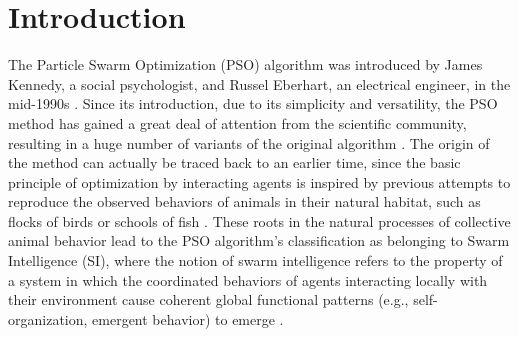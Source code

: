 \documentclass{ims9x6}
\begin{document}
\vspace*{12pt}

\chaptercontents  %

\section{Introduction}

The Particle Swarm Optimization (PSO) algorithm was introduced by James Kennedy, a social psychologist, and Russel Eberhart, an electrical engineer, in the mid-1990s \cite{kennedy1995particle,kennedy1997particle}. Since its introduction, due to its simplicity and versatility, the PSO method has gained a great deal of attention from the scientific community, resulting in a huge number of variants of the original algorithm \cite{kennedy2010particle,poli2007particle,shieber98,hassan04,wang2017particle}. The origin of the method can actually be traced back to an earlier time, since the basic principle of optimization by interacting agents is inspired by previous attempts to reproduce the observed behaviors of animals in their natural habitat, such as flocks of birds or schools of fish \cite{Aoki,Okubo,Vicseck,Giardina2008collective,boids1987,CFT}. These roots in the natural processes of collective animal behavior lead to the PSO algorithm's classification as belonging to Swarm Intelligence (SI), where the notion of swarm intelligence refers to the property of a system in which the coordinated behaviors of agents interacting locally with their environment cause coherent global functional patterns (e.g., self-organization, emergent behavior) to emerge \cite{Sumpter2010collective,Dorigo,cucker2007,motsch2014,CS}. 
\end{document}
